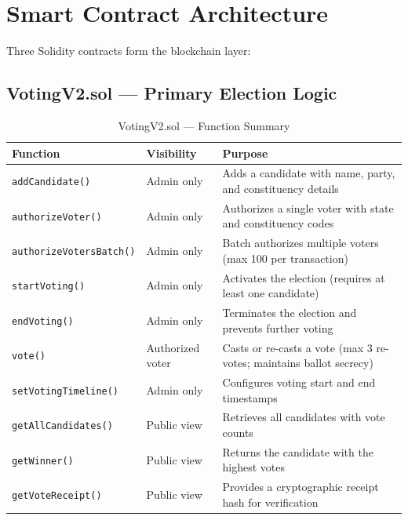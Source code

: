\documentclass[oneside,a4paper,12pt]{book}
\begin{document}
\section{Smart Contract Architecture}

Three Solidity contracts form the blockchain layer:

\subsection{VotingV2.sol --- Primary Election Logic}

\begin{table}[htbp]
\centering
\renewcommand{\arraystretch}{1.2}
\small
\begin{tabularx}{\textwidth}{|p{4cm}|p{2.5cm}|X|}
\hline
\textbf{Function} & \textbf{Visibility} & \textbf{Purpose} \\
\hline
\texttt{addCandidate()} & Admin only & Adds a candidate with name, party, and constituency details \\
\hline
\texttt{authorizeVoter()} & Admin only & Authorizes a single voter with state and constituency codes \\
\hline
\texttt{authorizeVotersBatch()} & Admin only & Batch authorizes multiple voters (max 100 per transaction) \\
\hline
\texttt{startVoting()} & Admin only & Activates the election (requires at least one candidate) \\
\hline
\texttt{endVoting()} & Admin only & Terminates the election and prevents further voting \\
\hline
\texttt{vote()} & Authorized voter & Casts or re-casts a vote (max 3 re-votes; maintains ballot secrecy) \\
\hline
\texttt{setVotingTimeline()} & Admin only & Configures voting start and end timestamps \\
\hline
\texttt{getAllCandidates()} & Public view & Retrieves all candidates with vote counts \\
\hline
\texttt{getWinner()} & Public view & Returns the candidate with the highest votes \\
\hline
\texttt{getVoteReceipt()} & Public view & Provides a cryptographic receipt hash for verification \\
\hline
\end{tabularx}
\caption{VotingV2.sol --- Function Summary}
\label{tab:votingv2}
\end{table}
\end{document}
